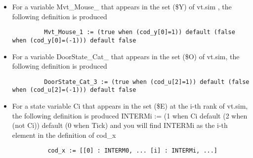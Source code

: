 \begin{itemize}
\item For a variable Mvt\_\-Mouse\_ that appears in the set (\$Y) of vt.sim , the following definition is produced 

\footnotesize\begin{verbatim}         Mvt_Mouse_1 := (true when (cod_y[0]=1)) default (false when (cod_y[0]=(-1))) default false
\end{verbatim}
\normalsize
\item For a variable Door\-State\_\-Cat\_ that appears in the set (\$O) of vt.sim, the following definition is produced 

\footnotesize\begin{verbatim}         DoorState_Cat_3 := (true when (cod_u[2]=1)) default (false when (cod_u[2]=(-1))) default false
\end{verbatim}
\normalsize
\item For a state variable Ci that appears in the set (\$E) at the i-th rank of vt.sim, the following definition is produced INTERMi := (1 when Ci default (2 when (not Ci)) default (0 when Tick) and you will find INTERMi as the i-th element in the definition of cod\_\-x 

\footnotesize\begin{verbatim}          cod_x := [[0] : INTERM0, ... [i] : INTERMi, ...]
\end{verbatim}
\normalsize
 \end{itemize}
